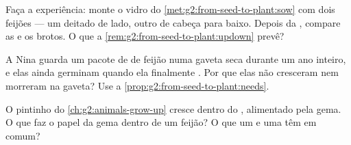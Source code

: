 \begin{exercise}[$\star$]\label{exo:g2:from-seed-to-plant:8}
Faça a experiência: monte o vidro do
\cref{met:g2:from-seed-to-plant:sow} com dois feijões --- um deitado
de lado, outro de cabeça para baixo. Depois da , compare
as  e os brotos. O que a \cref{rem:g2:from-seed-to-plant:updown}
prevê?
\end{exercise}

\begin{exercise}[$\star\star$]\label{exo:g2:from-seed-to-plant:9}
A Nina guarda um pacote de  de feijão numa gaveta seca
durante um ano inteiro, e elas ainda germinam quando ela finalmente
. Por que elas não cresceram nem morreram na gaveta? Use a
\cref{prop:g2:from-seed-to-plant:needs}.
\end{exercise}

\begin{exercise}[$\star\star$]\label{exo:g2:from-seed-to-plant:10}
O pintinho do \cref{ch:g2:animals-grow-up} cresce dentro do ,
alimentado pela gema. O que faz o papel da gema dentro de um feijão?
O que um  e uma  têm em comum?
\end{exercise}
